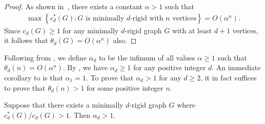\documentclass[ALCO]{cedram}
\begin{document}
\begin{proof}
	As shown in~\cite{BartzosUpperBound},
	there exists a constant $\alpha>1$ such that
	\begin{align*}
		\max \left\{ c^*_d(G) : G \text{ is minimally $d$-rigid with $n$ vertices} \right\} = O(\alpha^n).
	\end{align*}
	Since $c_d(G) \geq 1$ for any minimally $d$-rigid graph $G$ with at least $d+1$ vertices,
	it follows that $\theta_d(G) = O(\alpha^n)$ also.
\end{proof}

Following from ,
we define $\alpha_d$ to be the infimum of all values $\alpha \geq 1$ such that $\theta_d(n) = O(\alpha^n)$.
By ,
we have $\alpha_d \geq 1$ for any positive integer $d$.
An immediate corollary to  is that $\alpha_1=1$.
To prove that $\alpha_d >1$ for any $d \geq 2$, it in fact suffices to prove that $\theta_d(n) >1$ for some positive integer $n$.



\begin{proposition}\label{p:lowerasym}
	Suppose that there exists a minimally $d$-rigid graph $G$ where $c^*_d(G)/c_d(G) >1$.
	Then $\alpha_d >1$.
\end{proposition}
\end{document}
